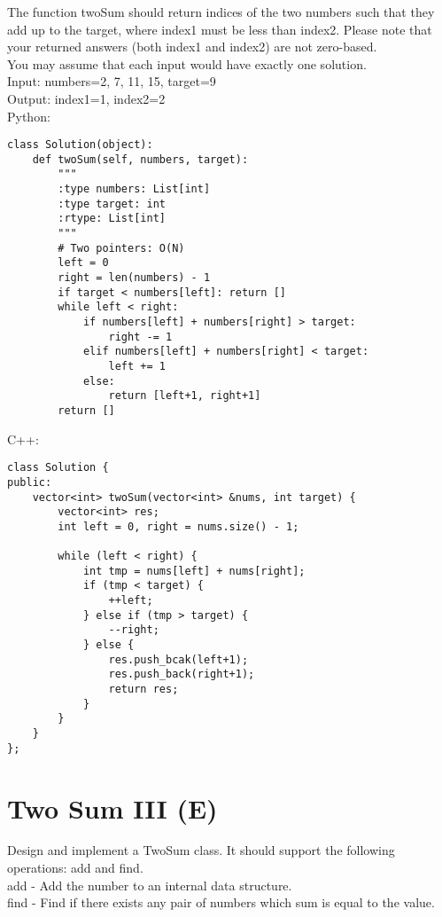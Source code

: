 The function twoSum should return indices of the two numbers such that they add up to the target, where index1 must be less than index2. Please note that your returned answers (both index1 and index2) are not zero-based.\\

You may assume that each input would have exactly one solution.\\

Input: numbers={2, 7, 11, 15}, target=9\\
Output: index1=1, index2=2\\

Python:
\lstset{language=python}
\begin{lstlisting}
class Solution(object):
    def twoSum(self, numbers, target):
        """
        :type numbers: List[int]
        :type target: int
        :rtype: List[int]
        """
        # Two pointers: O(N)
        left = 0
        right = len(numbers) - 1
        if target < numbers[left]: return []
        while left < right:
            if numbers[left] + numbers[right] > target:
                right -= 1
            elif numbers[left] + numbers[right] < target:
                left += 1
            else:
                return [left+1, right+1]
        return []
   \end{lstlisting}         

C++:
\lstset{language=C++}
\begin{lstlisting}
class Solution {
public:
    vector<int> twoSum(vector<int> &nums, int target) {
        vector<int> res;
        int left = 0, right = nums.size() - 1;
        
        while (left < right) {
            int tmp = nums[left] + nums[right];
            if (tmp < target) {
                ++left;
            } else if (tmp > target) {
                --right;
            } else {
                res.push_bcak(left+1);
                res.push_back(right+1);
                return res;
            }
        }
    }
};
\end{lstlisting}


\section{Two Sum III (E)}
Design and implement a TwoSum class. It should support the following operations: add and find.\\

add - Add the number to an internal data structure.\\
find - Find if there exists any pair of numbers which sum is equal to the value.\\

